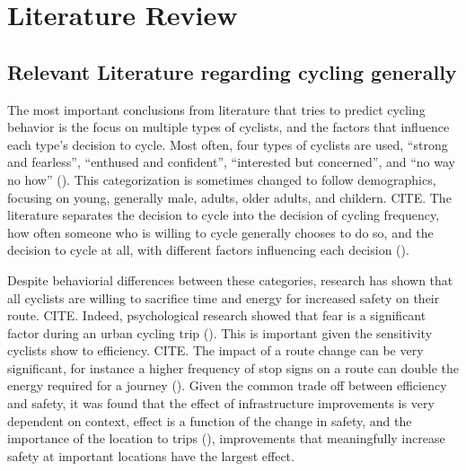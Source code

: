 \documentclass[11pt]{article} %
\begin{document}

\section{Literature Review}

\subsection{Relevant Literature regarding cycling generally}

The most important conclusions from literature that tries to predict cycling behavior is the focus on multiple types of cyclists, and the factors that influence each type's decision to cycle. Most often, four types of cyclists are used, ``strong and fearless'', ``enthused and confident'', ``interested but concerned'', and ``no way no how'' (\cite{dill2013four}). This categorization is sometimes changed to follow demographics, focusing on young, generally male, adults, older adults, and childern. CITE. The literature separates the decision to cycle into the decision of cycling frequency, how often someone who is willing to cycle generally chooses to do so, and the decision to cycle at all, with different factors influencing each decision (\cite{stinson2005comparison}). 

Despite behaviorial differences between these categories, research has shown that all cyclists are willing to sacrifice time and energy for increased safety on their route. CITE. Indeed, psychological research showed that fear is a significant factor during an urban cycling trip (\cite{ellett2018state}). This is important given the sensitivity cyclists show to efficiency. CITE. The impact of a route change can be very significant, for instance a higher frequency of stop signs on a route can double the energy required for a journey (\cite{fajans2001bicyclists}). Given the common trade off between efficiency and safety, it was found that the effect of infrastructure improvements is very dependent on context, effect is a function of the change in safety, and the importance of the location to trips (\cite{kondo2018bike}), improvements that meaningfully increase safety at important locations have the largest effect. 
\end{document}
